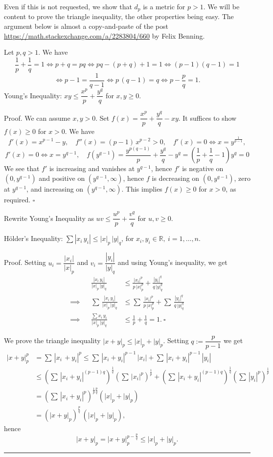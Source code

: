 \documentclass[12pt,letterpaper]{article}
\newcommand{\noi}{\noindent}%
\begin{document}
Even if this is not requested, we show that $d_p$ is a metric for $p>1$. We will be content to prove the triangle inequality, the other properties being easy. The argument below is almost a copy-and-paste of the post \url{https://math.stackexchange.com/a/2283804/660} by Felix Benning. 

Let $p,q>1$. We have 
$$
\frac1p+\frac1q=1\iff p+q=pq\iff pq-(p+q)+1=1\iff(p-1)(q-1)=1
$$ 
$$
\iff p-1=\frac1{q-1}\iff p\,(q-1)=q\iff p-\frac pq=1.
$$ 
Young's Inequality: $xy\le\dfrac{x^p}p+\dfrac{y^q}q$ for $x,y\ge0$. 

\noi Proof. We can assume $x,y>0$. Set $f(x)=\dfrac{x^p}p+\dfrac{y^q}q-xy$. It suffices to show $f(x)\ge0$ for $x>0$. We have 
$$
f'(x)=x^{p-1}-y,\quad f''(x)=(p-1)\,x^{p-2}>0,\quad f'(x)=0\iff x=y^{\frac1{p-1}},
$$
$$
f'(x)=0\iff x=y^{q-1},\quad f(y^{q-1})=\frac{y^{p(q-1)}}p+\frac{y^q}q-y^q=\left(\frac1p+\frac1q-1\right)y^q=0
$$ 
We see that $f'$ is increasing and vanishes at $y^{q-1}$, hence $f'$ is negative on $(0,y^{q-1})$ and positive on $(y^{q-1},\infty)$, hence $f$ is decreasing on $(0,y^{q-1})$, zero at $y^{q-1}$, and increasing on $(y^{q-1},\infty)$. This implies $f(x)\ge0$ for $x>0$, as required. $\square$ 

\noi Rewrite Young's Inequality as $uv\le\dfrac{u^p}p+\dfrac{v^q}q$ for $u,v\ge0$.
 
\noi Hölder's Inequality: $\sum|x_i\,y_i|\le|x|_p\,|y|_q$, for $x_i,y_i\in\mathbb R,\ i=1,\ldots,n$.

\noi Proof. Setting $u_i=\dfrac{|x_i|}{|x|_p}$ and $v_i=\dfrac{|y_i|}{|y|_q}$ and using Young's inequality, we get 
\begin{align*}
&&\frac{|x_i\,y_i|}{|x|_p\,|y|_q}&\le\frac{|x_i|^p}{p\,|x|_p^p}+\frac{|y_i|^q}{q\,|y|_q^q}\\[8pt] 
\implies&&\sum\,\frac{|x_i\,y_i|}{|x|_p\,|y|_q}&\le\sum\,\frac{|x_i|^p}{p\,|x|_p^p}+\sum\,\frac{|y_i|^q}{q\,|y|_q^q}\\[8pt] 
\implies&&\frac{\sum x_i\,y_i}{|x|_p\,|y|_q}&\le\frac1p+\frac1q=1.\ \square
\end{align*} 

\noi We prove the triangle inequality $|x+y|_p\le|x|_p+|y|_p$. Setting $q:=\dfrac p{p-1}$ we get 
\begin{align*}
|x+y|_p^p&=\sum\,|x_i\,+y_i|^p\le\sum\,|x_i+y_i|^{p-1}\,|x_i|+\sum\,|x_i+y_i|^{p-1}\,|y_i|\\[8pt] 
&\le\left(\sum\,|x_i+y_i|^{(p-1)q}\right)^{\frac1q}\left(\sum\,|x_i|^p\right)^{\frac1p}+\left(\sum\,|x_i+y_i|^{(p-1)q}\right)^{\frac1q}\left(\sum\,|y_i|^p\right)^{\frac1p}\\[8pt] 
&=\left(\sum\,|x_i+y_i|^p\right)^{\frac1p\frac pq}\left(|x|_p+|y|_p\right)\\[8pt] 
&=\left(|x+y|_p\right)^{\frac pq}\,\left(|x|_p+|y|_p\right),
\end{align*} 
hence 
$$
|x+y|_p=|x+y|_p^{p-\frac pq}\le|x|_p+|y|_p.
$$ \smallskip\hrule\bigskip
\end{document}
